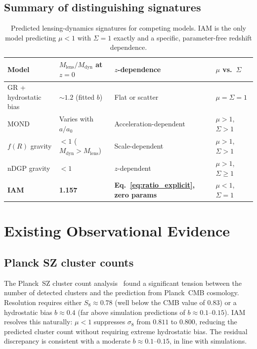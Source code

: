 \documentclass[12pt,a4paper]{article}
\begin{document}
\subsection{Summary of distinguishing signatures}

\begin{table}[h]
\centering
\small
\caption{Predicted lensing-dynamics signatures for competing models.
IAM is the only model predicting $\mu < 1$ with $\Sigma = 1$ exactly and
a specific, parameter-free redshift dependence.}
\label{tab:models}
\begin{tabular}{p{3.0cm}p{2.8cm}p{2.8cm}p{2.8cm}}
\toprule
Model & $M_\mathrm{lens}/M_\mathrm{dyn}$ at $z=0$ & $z$-dependence & $\mu$ vs.\ $\Sigma$ \\
\midrule
GR + hydrostatic bias & $\sim 1.2$ (fitted $b$) & Flat or scatter & $\mu = \Sigma = 1$ \\[4pt]
MOND & Varies with $a/a_0$ & Acceleration-dependent & $\mu > 1$, $\Sigma > 1$ \\[4pt]
$f(R)$ gravity & $< 1$ ($M_\mathrm{dyn} > M_\mathrm{lens}$) & Scale-dependent & $\mu > 1$, $\Sigma > 1$ \\[4pt]
nDGP gravity & $< 1$ & $z$-dependent & $\mu > 1$, $\Sigma \geq 1$ \\[4pt]
\textbf{IAM} & \textbf{1.157} & \textbf{Eq.~\ref{eq:ratio_explicit}, zero params} & $\mu < 1$, $\Sigma = 1$ \\
\bottomrule
\end{tabular}
\end{table}

\section{Existing Observational Evidence}

\subsection{Planck SZ cluster counts}

The Planck~SZ cluster count analysis~\citep{PlanckClusters2016} found a
significant tension between the number of detected clusters and the prediction
from Planck~CMB cosmology. Resolution requires either $S_8 \approx 0.78$ (well
below the CMB value of $0.83$) or a hydrostatic bias $b \approx 0.4$ (far above
simulation predictions of $b \approx 0.1$--$0.15$). IAM resolves this naturally:
$\mu < 1$ suppresses $\sigma_8$ from $0.811$ to $0.800$, reducing the predicted
cluster count without requiring extreme hydrostatic bias. The residual discrepancy
is consistent with a moderate $b \approx 0.1$--$0.15$, in line with simulations.
\end{document}

